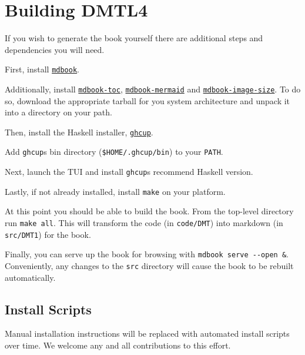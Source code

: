 \documentclass{book}
\begin{document}
\hypertarget{pandoc.profile.debug__pandoc__debug__src__build.md__building-dmtl4}{%
\section*{Building DMTL4}\label{pandoc.profile.debug__pandoc__debug__src__build.md__building-dmtl4}}

If you wish to generate the book yourself there are additional steps and
dependencies you will need.

First, install \href{https://github.com/rust-lang/mdBook/releases/tag/v0.4.43}{\texttt{mdbook}}.

Additionally, install \href{https://github.com/badboy/mdbook-toc/releases/tag/0.14.2}{\texttt{mdbook-toc}}, \href{https://github.com/badboy/mdbook-mermaid/releases/tag/v0.14.1}{\texttt{mdbook-mermaid}} and
\href{https://github.com/lhybdv/mdbook-image-size/releases/tag/0.2.0}{\texttt{mdbook-image-size}}. To do so, download the appropriate tarball for you
system architecture and unpack it into a directory on your path.

Then, install the Haskell installer, \href{https://www.haskell.org/ghcup/}{\texttt{ghcup}}.

Add \texttt{ghcup}\textquotesingle s bin directory (\texttt{\$HOME/.ghcup/bin}) to your \texttt{PATH}.

Next, launch the TUI and install \texttt{ghcup}\textquotesingle s recommend Haskell version.

Lastly, if not already installed, install \texttt{make} on your platform.

At this point you should be able to build the book. From the top-level
directory run \texttt{make\ all}. This will transform the code (in \texttt{code/DMT}) into
markdown (in \texttt{src/DMT1}) for the book.

Finally, you can serve up the book for browsing with \texttt{mdbook\ serve\ -\/-open\ \&}.
Conveniently, any changes to the \texttt{src} directory will cause the book to be
rebuilt automatically.

\hypertarget{pandoc.profile.debug__pandoc__debug__src__build.md__install-scripts}{%
\subsection*{Install Scripts}\label{pandoc.profile.debug__pandoc__debug__src__build.md__install-scripts}}

Manual installation instructions will be replaced with automated install
scripts over time. We welcome any and all contributions to this effort.
\end{document}
